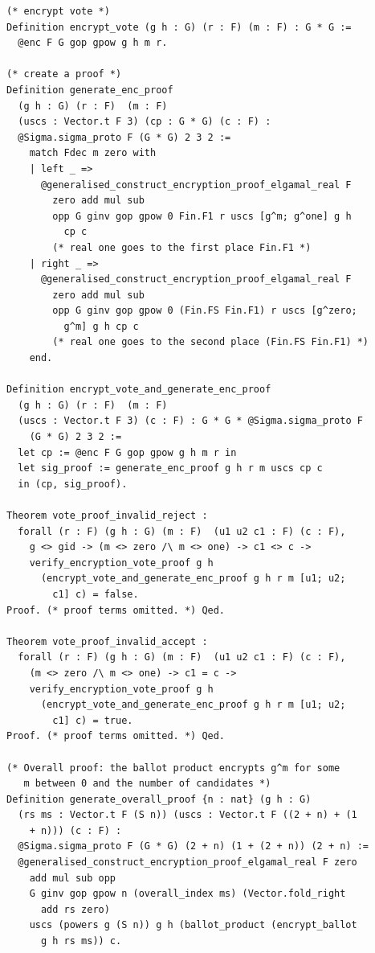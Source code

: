 \begin{lstlisting}[frame=single, language=Coq, caption={Frontend Functions},
  label={frontend_fun},captionpos=t, basicstyle=\ttfamily\scriptsize,
  abovecaptionskip=-\medskipamount]
(* encrypt vote *)
Definition encrypt_vote (g h : G) (r : F) (m : F) : G * G :=
  @enc F G gop gpow g h m r.

(* create a proof *)
Definition generate_enc_proof 
  (g h : G) (r : F)  (m : F) 
  (uscs : Vector.t F 3) (cp : G * G) (c : F) : 
  @Sigma.sigma_proto F (G * G) 2 3 2 :=
    match Fdec m zero with 
    | left _ => 
      @generalised_construct_encryption_proof_elgamal_real F
        zero add mul sub 
        opp G ginv gop gpow 0 Fin.F1 r uscs [g^m; g^one] g h
          cp c 
        (* real one goes to the first place Fin.F1 *)
    | right _ =>  
      @generalised_construct_encryption_proof_elgamal_real F
        zero add mul sub 
        opp G ginv gop gpow 0 (Fin.FS Fin.F1) r uscs [g^zero;
          g^m] g h cp c 
        (* real one goes to the second place (Fin.FS Fin.F1) *)
    end.

Definition encrypt_vote_and_generate_enc_proof 
  (g h : G) (r : F)  (m : F) 
  (uscs : Vector.t F 3) (c : F) : G * G * @Sigma.sigma_proto F
    (G * G) 2 3 2 := 
  let cp := @enc F G gop gpow g h m r in
  let sig_proof := generate_enc_proof g h r m uscs cp c
  in (cp, sig_proof).

Theorem vote_proof_invalid_reject :
  forall (r : F) (g h : G) (m : F)  (u1 u2 c1 : F) (c : F),
    g <> gid -> (m <> zero /\ m <> one) -> c1 <> c ->
    verify_encryption_vote_proof g h 
      (encrypt_vote_and_generate_enc_proof g h r m [u1; u2;
        c1] c) = false.
Proof. (* proof terms omitted. *) Qed. 

Theorem vote_proof_invalid_accept :
  forall (r : F) (g h : G) (m : F)  (u1 u2 c1 : F) (c : F),
    (m <> zero /\ m <> one) -> c1 = c ->
    verify_encryption_vote_proof g h 
      (encrypt_vote_and_generate_enc_proof g h r m [u1; u2;
        c1] c) = true.
Proof. (* proof terms omitted. *) Qed.

(* Overall proof: the ballot product encrypts g^m for some 
   m between 0 and the number of candidates *)
Definition generate_overall_proof {n : nat} (g h : G) 
  (rs ms : Vector.t F (S n)) (uscs : Vector.t F ((2 + n) + (1
    + n))) (c : F) : 
  @Sigma.sigma_proto F (G * G) (2 + n) (1 + (2 + n)) (2 + n) :=
  @generalised_construct_encryption_proof_elgamal_real F zero
    add mul sub opp 
    G ginv gop gpow n (overall_index ms) (Vector.fold_right
      add rs zero) 
    uscs (powers g (S n)) g h (ballot_product (encrypt_ballot
      g h rs ms)) c.


\end{lstlisting}

